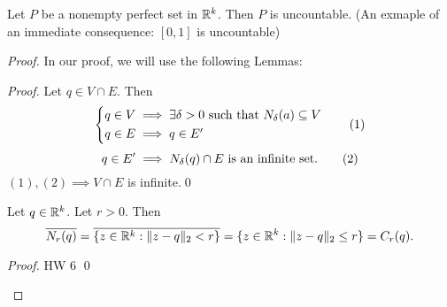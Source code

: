 \begin{theorem}
    \label{thm2.43}
    Let $P$ be a nonempty perfect set in $\mathbb{R}^k$. Then $P$ is uncountable. (An exmaple of an immediate consequence: $[0,1]$ is uncountable)
\end{theorem}
\begin{proof}
    In our proof, we will use the following Lemmas:
    \begin{proof}
        Let $q\in V\cap E.$ Then
        \begin{equation*}
            \begin{cases*}
                q \in V \implies \exists \delta > 0 \st \nbhd{\delta}{a} \subseteq V \\
                q \in E \implies q \in E'
            \end{cases*}
            \tag{$1$}
        \end{equation*}
        \begin{equation*}
            q \in E' \implies N_{\delta}(q)\cap E \text{ is an infinite set.}
            \tag{$2$}
        \end{equation*}
        $(1),(2) \implies V\cap E$ is infinite.\qed
    \end{proof}

    \begin{lemma}
        \label{lemma2}
        Let $q\in \mathbb{R}^k$. Let $r > 0.$ Then
        $$\overline{N_{r}(q)}=\overline{\{z\in \mathbb{R}^k : \|z-q\|_2 < r\}} = \{z\in \mathbb{R}^k : \|z-q\|_2 \leq r\} = C_r(q).$$
    \end{lemma}
    \begin{proof}
        HW 6 \qed
    \end{proof}


\end{proof}
